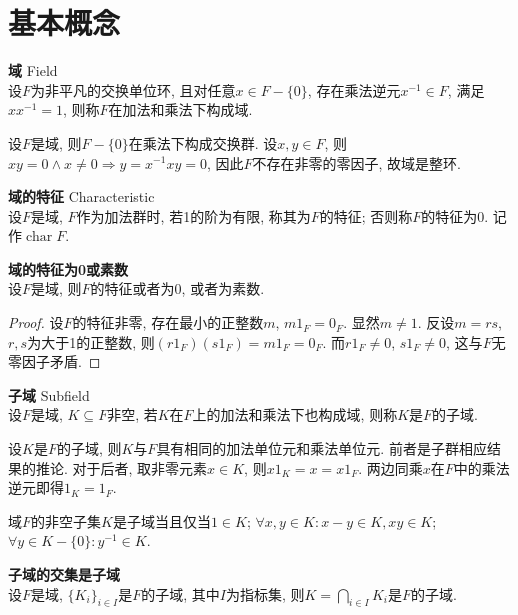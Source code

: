 \section{基本概念}

\begin{dfn} \textbf{域} Field\\
设$F$为非平凡的交换单位环, 且对任意$x\in F-\{0\}$, 存在乘法逆元$x^{-1}\in F$, 满足$xx^{-1}=1$, 则称$F$在加法和乘法下构成域. 
\end{dfn}
\par 设$F$是域, 则$F-\{0\}$在乘法下构成交换群. 设$x, y\in F$, 则$xy=0 \land x\neq 0\Rightarrow y=x^{-1}xy=0$, 因此$F$不存在非零的零因子, 故域是整环. 

\begin{dfn} \textbf{域的特征} Characteristic\\
设$F$是域, $F$作为加法群时, 若1的阶为有限, 称其为$F$的特征; 否则称$F$的特征为0. 记作$\operatorname{char} F$.
\end{dfn}

\begin{pro} \textbf{域的特征为0或素数}\\
设$F$是域, 则$F$的特征或者为0, 或者为素数. 
\end{pro}
\begin{proof}
设$F$的特征非零, 存在最小的正整数$m$, $m 1_F=0_F$. 显然$m\neq 1$. 反设$m=rs$, $r,s$为大于1的正整数, 则$(r1_F)(s1_F)=m 1_F=0_F$. 而$r1_F\neq 0$, $s1_F\neq 0$, 这与$F$无零因子矛盾. 
\end{proof}

\begin{dfn} \textbf{子域} Subfield\\
设$F$是域, $K\subseteq F$非空, 若$K$在$F$上的加法和乘法下也构成域, 则称$K$是$F$的子域.
\end{dfn}
\par 设$K$是$F$的子域, 则$K$与$F$具有相同的加法单位元和乘法单位元. 前者是子群相应结果的推论. 对于后者, 取非零元素$x\in K$, 则$x1_K=x=x1_F$. 两边同乘$x$在$F$中的乘法逆元即得$1_K=1_F$. 

\par 域$F$的非空子集$K$是子域当且仅当$1\in K$; $\forall x,y\in K: x-y\in K, xy\in K$; $\forall y\in K-\{0\}: y^{-1} \in K$.

\begin{pro} \textbf{子域的交集是子域}\\
设$F$是域, $\{K_i\}_{i\in I}$是$F$的子域, 其中$I$为指标集, 则$K=\bigcap_{i\in I} K_i$是$F$的子域. 
\end{pro}

